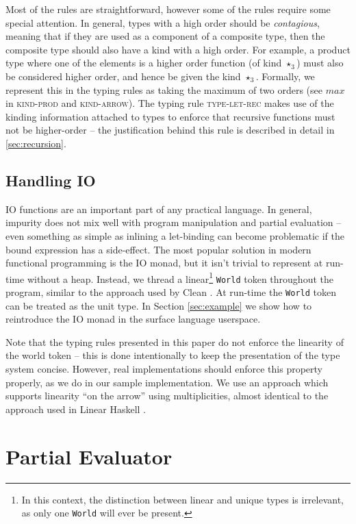 \documentclass[runningheads]{llncs}
\begin{document}
Most of the rules are straightforward, however some of the rules require some special attention. In general, types with a high order should be \emph{contagious}, meaning that if they are used as a component of a composite type, then the composite type should also have a kind with a high order. For example, a product type where one of the elements is a higher order function (of kind $\star_3$) must also be considered higher order, and hence be given the kind $\star_3$. Formally, we represent this in the typing rules as taking the maximum of two orders (see $max$ in \textsc{kind-prod} and \textsc{kind-arrow}). The typing rule \textsc{type-let-rec} makes use of the kinding information attached to types to enforce that recursive functions must not be higher-order -- the justification behind this rule is described in detail in \ref{sec:recursion}.


\subsection{Handling IO}

IO functions are an important part of any practical language. In general, impurity does not mix well with program manipulation and partial evaluation -- even something as simple as inlining a let-binding can become problematic if the bound expression has a side-effect. The most popular solution in modern functional programming is the IO monad, but it isn't trivial to represent at run-time without a heap. Instead, we thread a linear\footnote{In this context, the distinction between linear and unique types is irrelevant, as only one \texttt{World} will ever be present.} \texttt{World} token throughout the program, similar to the approach used by Clean \cite{koopman2002functional}. At run-time the \texttt{World} token can be treated as the unit type. In Section \ref{sec:example} we show how to reintroduce the IO monad in the surface language userspace.

Note that the typing rules presented in this paper do not enforce the linearity of the world token -- this is done intentionally to keep the presentation of the type system concise. However, real implementations should enforce this property properly, as we do in our sample implementation. We use an approach which supports linearity ``on the arrow'' using multiplicities, almost identical to the approach used in Linear Haskell \cite{bernardy2017linear}.


\section{Partial Evaluator}
\end{document}
